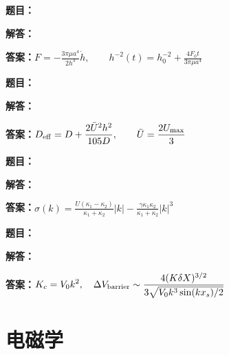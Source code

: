 \documentclass[lang=cn,color=blue,11pt]{elegantbook}
\begin{document}
\noindent\textbf{题目：}
\par\noindent\textbf{解答：}
\par\noindent\textbf{答案：}\(\displaystyle F=-\frac{3\pi\mu a^4}{2h^3}\dot h,\qquad h^{-2}(t)=h_0^{-2}+\frac{4F_0t}{3\pi\mu a^4}\)\par
\par\smallskip\noindent\hrulefill\par\medskip
{}\par
\noindent\textbf{题目：}
\par\noindent\textbf{解答：}
\par\noindent\textbf{答案：}\(\displaystyle D_{\rm eff}=D+\frac{2\bar U^2h^2}{105D},\qquad \bar U=\frac{2U_{\max}}3\)\par
\par\smallskip\noindent\hrulefill\par\medskip
{}\par
\noindent\textbf{题目：}
\par\noindent\textbf{解答：}
\par\noindent\textbf{答案：}\(\displaystyle \sigma(k)=\frac{U(\kappa_1-\kappa_2)}{\kappa_1+\kappa_2}|k|-\frac{\gamma\kappa_1\kappa_2}{\kappa_1+\kappa_2}|k|^3\)\par
\par\smallskip\noindent\hrulefill\par\medskip
{}\par
\noindent\textbf{题目：}
\par\noindent\textbf{解答：}
\par\noindent\textbf{答案：}\(\displaystyle K_c=V_0k^2,\quad\Delta V_{\rm barrier}\sim\frac{4(K\delta X)^{3/2}}{3\sqrt{V_0k^3\sin(kx_s)/2}}\)\par
\par\smallskip\noindent\hrulefill\par\medskip
\chapter{电磁学}
\end{document}
